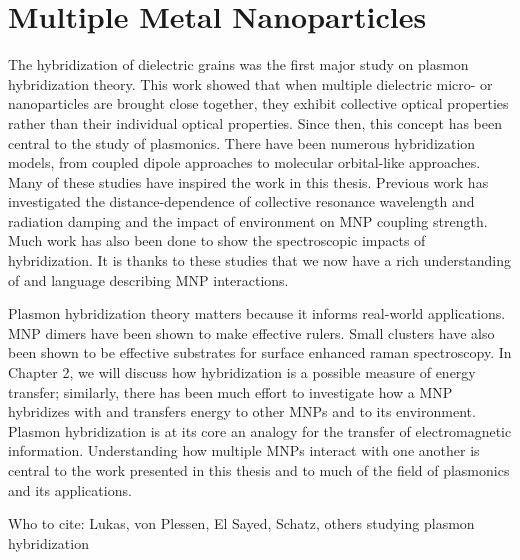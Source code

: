 \documentclass [11pt, proquest] {uwthesis}[2016/11/22]
\begin{document}
\section{Multiple Metal Nanoparticles}

The hybridization of dielectric grains was the first major study on plasmon hybridization theory\cite{Lucas1976}. This work showed that when multiple dielectric micro- or nanoparticles are brought close together, they exhibit collective optical properties rather than their individual optical properties. Since then, this concept has been central to the study of plasmonics. There have been numerous hybridization models, from coupled dipole approaches\cite{Schatz2003} to molecular orbital-like approaches\cite{Oubre2004,NordProdan2004}. Many of these studies have inspired the work in this thesis. Previous work has investigated the distance-dependence of collective resonance wavelength and radiation damping\cite{vonPlessen2007} and the impact of environment on MNP coupling strength\cite{Elsayed2008}. Much work has also been done to show the spectroscopic impacts of hybridization\cite{Xu1995,Mischenko1995}. It is thanks to these studies that we now have a rich understanding of and language describing MNP interactions. 

Plasmon hybridization theory matters because it informs real-world applications. MNP dimers have been shown to make effective rulers\cite{Ruler}. Small clusters have also been shown to be effective substrates for surface enhanced raman spectroscopy\cite{SERS}. In Chapter 2, we will discuss how hybridization is a possible measure of energy transfer; similarly, there has been much effort to investigate how a MNP hybridizes with and transfers energy to other MNPs and to its environment\cite{CubeSubstrate,ARAVIND1981,ThakkarLandau}. Plasmon hybridization is at its core an analogy for the transfer of electromagnetic information. Understanding how multiple MNPs interact with one another is central to the work presented in this thesis and to much of the field of plasmonics and its applications.

Who to cite: Lukas, von Plessen, El Sayed, Schatz, others studying plasmon hybridization
\end{document}
